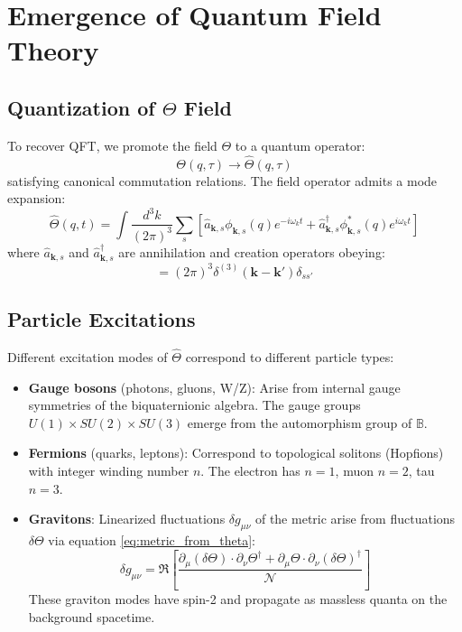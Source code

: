 \documentclass[12pt]{article}
\begin{document}
\section{Emergence of Quantum Field Theory}

\subsection{Quantization of $\Theta$ Field}

To recover QFT, we promote the field $\Theta$ to a quantum operator:
\begin{equation}
    \Theta(q, \tau) \to \hat{\Theta}(q, \tau)
\end{equation}
satisfying canonical commutation relations. The field operator admits a mode expansion:
\begin{equation}
    \hat{\Theta}(q, t) = \int \frac{d^3k}{(2\pi)^3} \sum_s \left[ \hat{a}_{\mathbf{k},s} \phi_{\mathbf{k},s}(q) e^{-i\omega_k t} + \hat{a}^\dagger_{\mathbf{k},s} \phi^*_{\mathbf{k},s}(q) e^{i\omega_k t} \right]
\end{equation}
where $\hat{a}_{\mathbf{k},s}$ and $\hat{a}^\dagger_{\mathbf{k},s}$ are annihilation and creation operators obeying:
\begin{equation}
    [\hat{a}_{\mathbf{k},s}, \hat{a}^\dagger_{\mathbf{k}',s'}] = (2\pi)^3 \delta^{(3)}(\mathbf{k}-\mathbf{k}') \delta_{ss'}
\end{equation}

\subsection{Particle Excitations}

Different excitation modes of $\hat{\Theta}$ correspond to different particle types:

\begin{itemize}
    \item \textbf{Gauge bosons} (photons, gluons, W/Z): Arise from internal gauge symmetries of the biquaternionic algebra. The gauge groups $U(1) \times SU(2) \times SU(3)$ emerge from the automorphism group of $\mathbb{B}$.
    
    \item \textbf{Fermions} (quarks, leptons): Correspond to topological solitons (Hopfions) with integer winding number $n$. The electron has $n=1$, muon $n=2$, tau $n=3$.
    
    \item \textbf{Gravitons}: Linearized fluctuations $\delta g_{\mu\nu}$ of the metric arise from fluctuations $\delta\Theta$ via equation \eqref{eq:metric_from_theta}:
    \begin{equation}
        \delta g_{\mu\nu} = \Re\left[\frac{\partial_\mu (\delta\Theta) \cdot \partial_\nu \Theta^\dagger + \partial_\mu \Theta \cdot \partial_\nu (\delta\Theta)^\dagger}{\mathcal{N}}\right]
    \end{equation}
    These graviton modes have spin-2 and propagate as massless quanta on the background spacetime.
\end{itemize}
\end{document}
